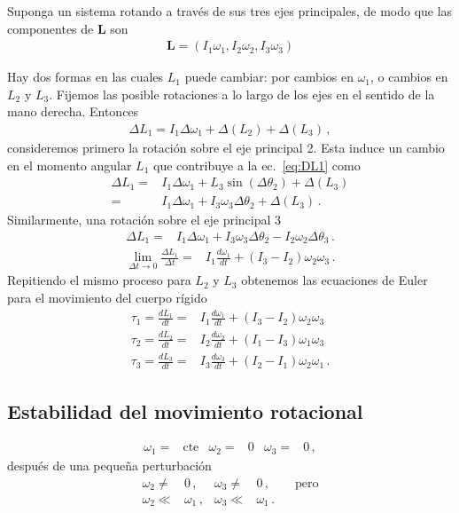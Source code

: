 Suponga un sistema rotando a través de sus tres ejes principales, de modo que las componentes de $\mathbf{L}$ son
\begin{align}
  \mathbf{L}=(I_1\omega_1,I_2\omega_2,I_3\omega_3)
\end{align}

Hay dos formas en las cuales $L_1$ puede cambiar: por cambios en $\omega_1$, o cambios en $L_2$ y $L_3$. Fijemos las posible rotaciones a lo largo de los ejes en el sentido de la mano derecha. Entonces
\begin{align}
  \label{eq:DL1}
  \Delta L_1=I_1\Delta\omega_1+\Delta(L_2)+\Delta(L_3)\,,
\end{align}
consideremos primero la rotación sobre el eje principal 2. Esta induce un cambio en el momento angular $L_1$ que contribuye a la ec.~\eqref{eq:DL1} como
\begin{align}
    \Delta L_1=&I_1\Delta\omega_1+L_3\sin(\Delta\theta_2)+\Delta(L_3)\nonumber\\
    =&I_1\Delta\omega_1+I_3\omega_3\Delta\theta_2+\Delta(L_3)\,.
\end{align}
Similarmente, una rotación sobre el eje principal 3
\begin{align}
    \Delta L_1=&I_1\Delta\omega_1+I_3\omega_3\Delta\theta_2-I_2\omega_2\Delta\theta_3\,.
\end{align}
\begin{align}
  \lim_{\Delta t\to 0}\frac{\Delta L_1}{\Delta t}=&
I_1\frac{d\omega_1}{dt}+(I_3-I_2)\omega_2\omega_3\,.
\end{align}
Repitiendo el mismo proceso para $L_2$ y $L_3$ obtenemos las ecuaciones de Euler para el movimiento del cuerpo rígido
\begin{align}
  \tau_1=\frac{dL_1}{dt}=&I_1\frac{d\omega_1}{dt}+(I_3-I_2)\omega_2\omega_3\nonumber\\
  \tau_2=\frac{dL_2}{dt}=&I_2\frac{d\omega_2}{dt}+(I_1-I_3)\omega_1\omega_3\nonumber\\
  \tau_3=\frac{dL_3}{dt}=&I_3\frac{d\omega_3}{dt}+(I_2-I_1)\omega_2\omega_1\,.
\end{align}
\subsection{Estabilidad del movimiento rotacional}
\begin{align}
\omega_1=&\text{cte}&   \omega_2=&0& \omega_3=&0\,,
\end{align}
después de una pequeña perturbación
\begin{align}
  \omega_2\ne&0\,,&\omega_3\ne&0\,,\qquad\text{pero}\nonumber\\
  \omega_2\ll& \omega_1 \,,&\omega_3\ll &\omega_1\,.
\end{align}


